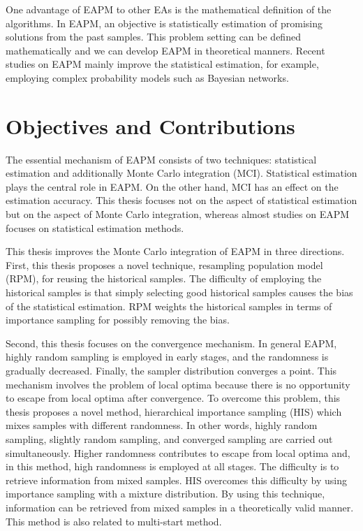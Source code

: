 One advantage of EAPM to other EAs is
the mathematical definition of the algorithms.
In EAPM, an objective is statistically estimation of
promising solutions from the past samples.
This problem setting can be defined mathematically 
and we can develop EAPM in theoretical manners.
Recent studies on EAPM \cite{larranaga:eda} mainly improve the
statistical estimation, for example,
employing complex probability models such as Bayesian networks.


\section{Objectives and Contributions}
The essential mechanism of EAPM consists of two techniques:
statistical estimation and additionally Monte Carlo integration (MCI).
Statistical estimation plays the central role in EAPM.
On the other hand, MCI has an effect on the estimation accuracy.
This thesis focuses not on the aspect of statistical estimation
but on the aspect of Monte Carlo integration,
whereas almost studies on EAPM focuses on 
statistical estimation methods.

This thesis improves the Monte Carlo integration of EAPM
in three directions.
First, this thesis proposes a novel technique,
resampling population model (RPM),
for reusing the historical samples.
The difficulty of employing the historical samples is
that
simply selecting good historical samples causes 
the bias of the statistical estimation.
RPM weights the historical samples
in terms of importance sampling 
for possibly removing the bias.

Second,
this thesis focuses on the convergence mechanism.
In general EAPM,
highly random sampling is employed in early stages,
and the randomness is gradually decreased.
Finally, the sampler distribution converges a point.
This mechanism involves the problem of local optima
because there is no opportunity to escape from local optima after convergence.
To overcome this problem,
this thesis proposes a novel method,
hierarchical importance sampling (HIS) which mixes 
samples with different randomness.
In other words, highly random sampling, slightly random sampling, and
converged sampling are carried out simultaneously.
Higher randomness contributes to escape from local optima
and, in this method, high randomness is employed at all stages.
The difficulty is to retrieve information from mixed samples.
HIS overcomes this difficulty by using 
importance sampling with a mixture distribution.
By using this technique, information can be retrieved from mixed samples
in a theoretically valid manner.
This method is also related to multi-start method.

